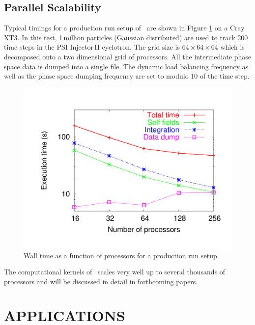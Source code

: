 \documentclass[acus]{JAC2003}
\begin{document}
\subsection{Parallel Scalability}
Typical timings for a production run setup of \opal\ are shown in Figure \ref{scalability} on a Cray XT3. 
In this test, 1\,million particles (Gaussian distributed) are used to track 200 time steps in the PSI Injector\,II cyclotron. The grid size is $64 \times 64 \times 64$ which is decomposed onto a two dimensional grid of processors. All the intermediate phase space data is dumped into 
a single \hfifepart file. The dynamic load balancing frequency as well as the phase space dumping frequency are set to modulo 10 of the time step.
\begin{figure}[ht!]
\includegraphics[width=.7\linewidth]{Timing64mesh}
  \caption{Wall time as a function of processors for a production run setup}
  \label{scalability}
\end{figure}
The computational kernels of \opal\ scales very well up to several thousands of processors and will be discussed in detail in forthcoming papers. 
\vspace{-3.5mm}
\section{APPLICATIONS}
\end{document}
